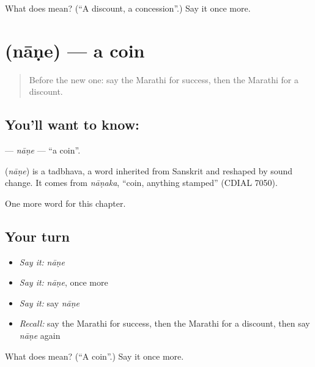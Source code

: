 \begin{tcolorbox}[breakable,colback=teal!4,colframe=teal!35!black,title={Before you move on}]
What does  mean? (\textquotedblleft{}A discount, a concession\textquotedblright{}.) Say it once more.
\end{tcolorbox}
\section[\texorpdfstring{\mr{नाणे} (nāṇe)}{नाणे (nāṇe)}]{ (nāṇe) — a coin}

\label{lesson:MR-C182-nane}



\begin{quote}
Before the new one: say the Marathi for success, then the Marathi for a discount.
\end{quote}

\subsection*{You'll want to know: }
\textbf{} — \emph{nāṇe} — \textquotedblleft{}a coin\textquotedblright{}.

\begin{cousinweb}
\textbf{} (\emph{nāṇe}) is a tadbhava, a word inherited from Sanskrit and reshaped by sound change. It comes from \emph{nāṇaka}, \textquotedblleft{}coin, anything stamped\textquotedblright{} (CDIAL 7050).
\end{cousinweb}

\begin{grammarlens}[title={What you've built}]
One more word for this chapter.
\end{grammarlens}

\subsection*{Your turn}
\begin{itemize}
\raggedright
  \item \emph{Say it:} \emph{nāṇe}
  \item \emph{Say it:} \emph{nāṇe}, once more
  \item \emph{Say it:} say \emph{nāṇe}
  \item \emph{Recall:} say the Marathi for success, then the Marathi for a discount, then say \emph{nāṇe} again
\end{itemize}

\begin{tcolorbox}[breakable,colback=teal!4,colframe=teal!35!black,title={Before you move on}]
What does  mean? (\textquotedblleft{}A coin\textquotedblright{}.) Say it once more.
\end{tcolorbox}
